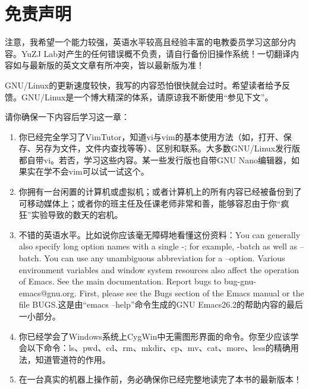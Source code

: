 \documentclass{book}
\begin{document}
\section{免责声明}
{\color{red} {注意，我希望一个能力较强，英语水平较高且经验丰富的电教委员学习这部分内容。YuZJ Lab对产生的任何错误概不负责，请自行备份旧操作系统！一切翻译内容如与最新版的英文文章有所冲突，皆以最新版为准！}}\par
GNU/Linux的更新速度较快，我写的内容恐怕很快就会过时。希望读者给予反馈。GNU/Linux是一个博大精深的体系，请原谅我不断使用“参见下文”。\par
请你确保一下内容后学习这一章：
\begin{enumerate}
	\item 你已经完全学习了VimTutor，知道vi与vim的基本使用方法（如，打开、保存、另存为文件，文件内查找等等）、区别和联系。大多数GNU/Linux发行版都自带vi。若否，学习这些内容。某一些发行版也自带GNU Nano编辑器，如果实在学不会vim可以试一试这个。
	\item 你拥有一台闲置的计算机或虚拟机；或者计算机上的所有内容已经被备份到了可移动媒体上；或者你的班主任及任课老师非常和善，能够容忍由于你“疯狂”实验导致的数天的宕机。
	\item 不错的英语水平。比如说你应该毫无障碍地看懂这份资料：You can generally also specify long option names with a single -; for example, -batch as well as --batch.  You can use any unambiguous abbreviation for a --option. Various environment variables and window system resources also affect the operation of Emacs.  See the main documentation. Report bugs to bug-gnu-emacs@gnu.org.  First, please see the Bugs section of the Emacs manual or the file BUGS.这是由“emacs --help”命令生成的GNU Emacs26.2的帮助内容的最后一小部分。
	\item 你已经学会了Windows系统上CygWin中无需图形界面的命令。你至少应该学会以下命令：ls、pwd、cd、rm、mkdir、cp、mv、cat、more、less的精确用法，知道管道符的作用。
	\item 在一台真实的机器上操作前，务必确保你已经完整地读完了本书的最新版本！
\end{enumerate}
\end{document}
